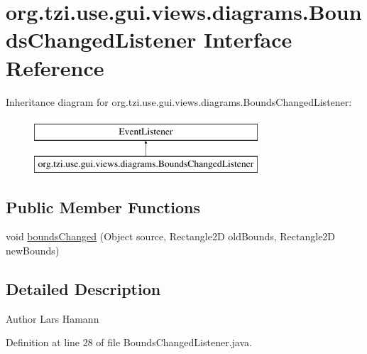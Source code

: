 \hypertarget{interfaceorg_1_1tzi_1_1use_1_1gui_1_1views_1_1diagrams_1_1_bounds_changed_listener}{\section{org.\-tzi.\-use.\-gui.\-views.\-diagrams.\-Bounds\-Changed\-Listener Interface Reference}
\label{interfaceorg_1_1tzi_1_1use_1_1gui_1_1views_1_1diagrams_1_1_bounds_changed_listener}
}
Inheritance diagram for org.\-tzi.\-use.\-gui.\-views.\-diagrams.\-Bounds\-Changed\-Listener\-:\begin{figure}[H]
\begin{center}
\leavevmode
\includegraphics[height=2.000000cm]{interfaceorg_1_1tzi_1_1use_1_1gui_1_1views_1_1diagrams_1_1_bounds_changed_listener}
\end{center}
\end{figure}
\subsection*{Public Member Functions}
\begin{DoxyCompactItemize}
\item 
void \hyperlink{interfaceorg_1_1tzi_1_1use_1_1gui_1_1views_1_1diagrams_1_1_bounds_changed_listener_a62903e138adbcd1fe8dbd64d5e19eb0b}{bounds\-Changed} (Object source, Rectangle2\-D old\-Bounds, Rectangle2\-D new\-Bounds)
\end{DoxyCompactItemize}


\subsection{Detailed Description}
\begin{DoxyAuthor}{Author}
Lars Hamann 
\end{DoxyAuthor}


Definition at line 28 of file Bounds\-Changed\-Listener.\-java.



